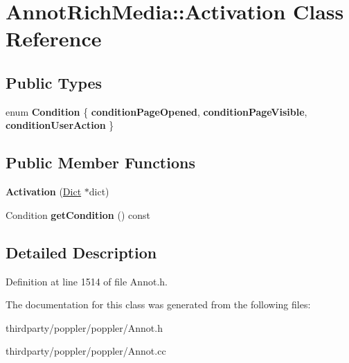\hypertarget{class_annot_rich_media_1_1_activation}{}\section{Annot\+Rich\+Media\+:\+:Activation Class Reference}
\label{class_annot_rich_media_1_1_activation}
\subsection*{Public Types}
\begin{DoxyCompactItemize}
\item 
\mbox{\label{class_annot_rich_media_1_1_activation_a1254ca38e61946fb533f4fb37dc4618e}} 
enum {\bfseries Condition} \{ {\bfseries condition\+Page\+Opened}, 
{\bfseries condition\+Page\+Visible}, 
{\bfseries condition\+User\+Action}
 \}
\end{DoxyCompactItemize}
\subsection*{Public Member Functions}
\begin{DoxyCompactItemize}
\item 
\mbox{\label{class_annot_rich_media_1_1_activation_a704f270f7dbe59ab95be4dd4a1dc8e32}} 
{\bfseries Activation} (\hyperlink{class_dict}{Dict} $\ast$dict)
\item 
\mbox{\label{class_annot_rich_media_1_1_activation_a521255ea478ee492f2cc00a7a625bd01}} 
Condition {\bfseries get\+Condition} () const
\end{DoxyCompactItemize}


\subsection{Detailed Description}


Definition at line 1514 of file Annot.\+h.



The documentation for this class was generated from the following files\+:\begin{DoxyCompactItemize}
\item 
thirdparty/poppler/poppler/Annot.\+h\item 
thirdparty/poppler/poppler/Annot.\+cc\end{DoxyCompactItemize}
